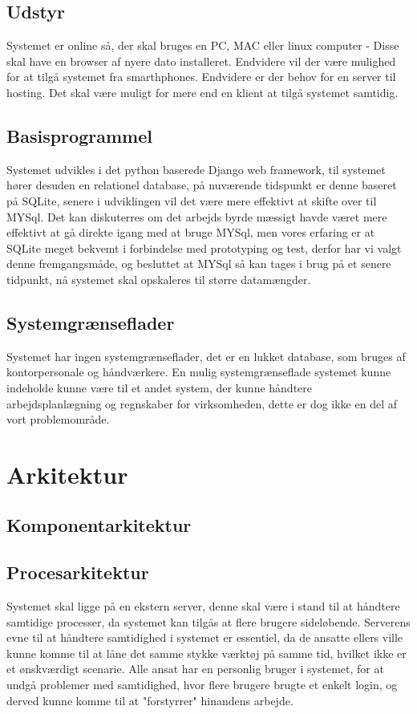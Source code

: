 \documentclass{article}
\begin{document}
\subsection{Udstyr}
Systemet er online så, der skal bruges en PC, MAC eller linux computer - Disse skal have en browser af nyere dato installeret. Endvidere vil der være mulighed for at tilgå systemet fra smarthphones. 
Endvidere er der behov for en server til hosting. 
Det skal være muligt for mere end en klient at tilgå systemet samtidig. 
\subsection{Basisprogrammel}
Systemet udvikles i det python baserede Django web framework, til systemet hører desuden en relationel database, på nuværende tidspunkt er denne baseret på SQLite, senere i udviklingen vil det være mere effektivt at skifte over til MYSql. Det kan diskuterres om det arbejds byrde mæssigt havde været mere effektivt at gå direkte igang med at bruge MYSql, men vores erfaring er at SQLite meget bekvemt i forbindelse med prototyping og test, derfor har vi valgt denne fremgangsmåde, og besluttet at MYSql så kan tages i brug på et senere tidpunkt, nå systemet skal opskaleres til større datamængder.  
\subsection{Systemgrænseflader} 
Systemet har ingen systemgrænseflader, det er en lukket database, som bruges af kontorpersonale og håndværkere. En mulig systemgrænseflade systemet kunne indeholde kunne være til et andet system, der kunne håndtere arbejdsplanlægning og regnskaber for virksomheden, dette er dog ikke en del af vort problemområde. 
\section{Arkitektur}
\subsection{Komponentarkitektur}

\subsection{Procesarkitektur}
Systemet skal ligge på en ekstern server, denne skal være i stand til at håndtere samtidige processer, da systemet kan tilgås at flere brugere sideløbende. Serverens evne til at håndtere samtidighed i systemet er essentiel, da de ansatte ellers ville kunne komme til at låne det samme stykke værktøj på samme tid, hvilket ikke er et ønskværdigt scenarie. 
Alle ansat har en personlig bruger i systemet, for at undgå problemer med samtidighed, hvor flere brugere brugte et enkelt login, og derved kunne komme til at "forstyrrer" hinandens arbejde.  
\end{document}
